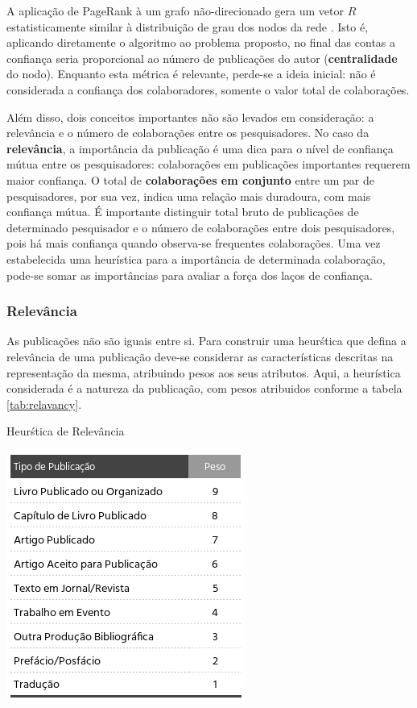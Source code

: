 \documentclass[12pt]{article}
\begin{document}
A aplicação de PageRank à um grafo não-direcionado gera um vetor $R$ estatisticamente similar à distribuição de grau dos nodos da 
rede \cite{perra2008spectral}. Isto é, aplicando diretamente o algoritmo ao problema proposto, no final das contas a confiança 
seria proporcional ao número de publicações do autor (\textbf{centralidade} do nodo). Enquanto esta métrica é relevante, perde-se 
a ideia inicial: não é considerada a confiança dos colaboradores, somente o valor total de colaborações. 

Além disso, dois conceitos importantes não são levados em consideração: a relevância e o número de colaborações entre os 
pesquisadores. No caso da \textbf{relevância}, a importância da publicação é uma dica para o nível de confiança mútua entre os 
pesquisadores: colaborações em publicações importantes requerem maior confiança. O total de \textbf{colaborações em conjunto} 
entre um par de pesquisadores, por sua vez, indica uma relação mais duradoura, com mais confiança mútua. É importante distinguir 
total bruto de publicações de determinado pesquisador e o número de colaborações entre dois pesquisadores, pois há mais confiança 
quando observa-se frequentes colaborações.  Uma vez estabelecida uma heurística para a importância de determinada colaboração, 
pode-se somar as importâncias para avaliar a força dos laços de confiança.

\subsubsection{Relevância}

As publicações não são iguais entre si. Para construir uma heurśtica que defina a relevância de uma publicação deve-se considerar as características descritas na representação da mesma, atribuindo pesos aos seus atributos. Aqui, a heurística considerada é a natureza da publicação, com pesos atribuidos conforme 
a tabela \ref{tab:relavancy}.

\begin{center}
  \begin{table}[ht]
    \centering
    \caption{Heurśtica de Relevância}
    \label{tab:relavancy}
    \includegraphics[width=.4\textwidth]{heuristics.png}
    \end{table}
\end{center}
\end{document}
